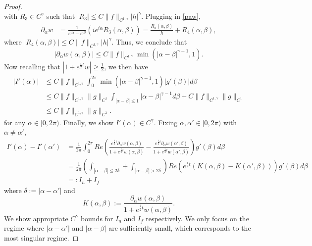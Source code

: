 \documentclass[10pt,a4paper]{amsart}
\newcommand{\p}{\partial}
\newcommand{\palpha}{\p_\alpha}
\begin{document}
\begin{proof}
$$    $$
    with $R_3 \in C^\gamma$ such that $|R_3| \le C\|f\|_{C^{1,\gamma}}|h|^\gamma$. Plugging in \eqref{paw},
    \begin{equation}
        \label{paw1}
        \begin{aligned}
            \palpha w &= \frac{1}{e^{i\alpha} - e^{i\beta}}\left(ie^{i\alpha} R_3(\alpha,\beta)\right) = \frac{R_3(\alpha,\beta)}{h} + R_4(\alpha,\beta),
        \end{aligned}
    \end{equation}
    where $|R_4(\alpha,\beta)| \le C\|f\|_{C^{1,\gamma}}|h|^\gamma$. Thus, we conclude that 
    \begin{equation}
        \label{est:paw}
        |\p_\alpha w(\alpha,\beta)| \le C\|f\|_{C^{1,\gamma}}\min(|\alpha - \beta|^{\gamma - 1}, 1).
    \end{equation}
    Now recalling that $|1 + e^{\frac{i}{2}t} w| \ge \frac12$, we then have
    \begin{equation}
        \label{est:logintegralC1}
        \begin{aligned}
        |I'(\alpha)| &\le C\|f\|_{C^{1,\gamma}}\int_0^{2\pi} \min(|\alpha - \beta|^{\gamma - 1}, 1) |g'(\beta)| d\beta \\
        &\le C\|f\|_{C^{1,\gamma}}\|g\|_{C^1}\int_{|\alpha - \beta| \le 1} |\alpha - \beta|^{\gamma - 1} d\beta + C\|f\|_{C^{1,\gamma}}\|g\|_{C^1}\\
        &\le C\|f\|_{C^{1,\gamma}}\|g\|_{C^1}.
        \end{aligned}
    \end{equation}
    for any $\alpha \in [0,2\pi)$.
    Finally, we show $I'(\alpha) \in C^\gamma$. Fixing $\alpha, \alpha' \in [0,2\pi)$ with $\alpha \neq \alpha'$, 
    \begin{equation}
        \label{eq:I'adiff}
        \begin{aligned}
        I'(\alpha) - I'(\alpha') &= \frac{1}{2\pi}\int_0^{2\pi}Re\left(\frac{e^{\frac{i}{2}t} \palpha w(\alpha,\beta)}{1+ e^{\frac{i}{2}t} w(\alpha,\beta)} - \frac{e^{\frac{i}{2}t} \palpha w(\alpha',\beta)}{1+ e^{\frac{i}{2}t} w(\alpha',\beta)}\right) g'(\beta) d\beta\\
        &=\frac{1}{2\pi}\left(\int_{|\alpha - \beta| \le 2\delta} + \int_{|\alpha - \beta| > 2\delta}\right)Re\left(e^{\frac{i}{2}t}(K(\alpha,\beta) - K(\alpha',\beta))\right) g'(\beta) d\beta\\
        &=: I_{n} + I_{f}
        \end{aligned}
    \end{equation}
    where $\delta := |\alpha - \alpha'|$ and
    $$
    K(\alpha,\beta) := \frac{\palpha w(\alpha,\beta)}{1+ e^{\frac{i}{2}t} w(\alpha,\beta)}.
    $$
    We show appropriate $C^\gamma$ bounds for $I_n$ and $I_f$ respectively. We only focus on the regime where $|\alpha - \alpha'|$ and $|\alpha-\beta|$ are sufficiently small, which corresponds to the most singular regime.
    

\end{proof}
\end{document}
